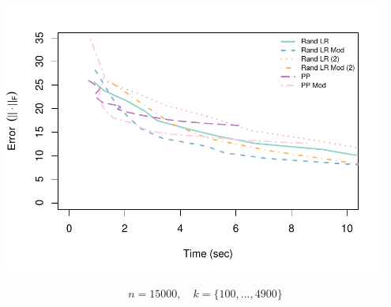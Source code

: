 \documentclass[t]{beamer}\usepackage[]{graphicx}\usepackage[]{color}
\newenvironment{knitrout}{}{} %
\begin{document}
\begin{frame}
{\begin{center}
\begin{knitrout}
{\centering \includegraphics[width=0.95\textwidth]{plots/unnamed-chunk-6-1} 

}



\end{knitrout}
\end{center}
}

\vspace{-10mm}
\[ n = 15000,\quad k=\{100,\ldots,4900\} \]

\end{frame}


\end{document}
